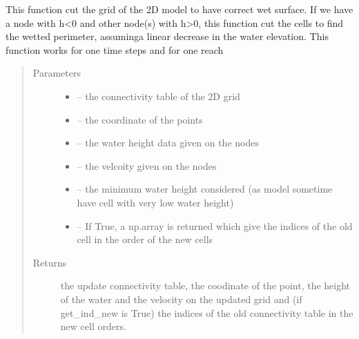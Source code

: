 \documentclass[letterpaper,10pt,english]{sphinxmanual}
\begin{document}
\begin{fulllineitems}
\label{\detokenize{index:src.manage_grid_8.cut_2d_grid}}
This function cut the grid of the 2D model to have correct wet surface. If we have a node with h\textless{}0 and other node(s)
with h\textgreater{}0, this function cut the cells to find the wetted perimeter, assuminga linear decrease in the water elevation.
This function works for one time steps and for one reach
\begin{quote}\begin{description}
\item[{Parameters}] \leavevmode\begin{itemize}
\item {} 
 -- the connectivity table of the 2D grid

\item {} 
 -- the coordinate of the points

\item {} 
 -- the water height data given on the nodes

\item {} 
 -- the velcoity given on the nodes

\item {} 
 -- the minimum water height considered (as model sometime have cell with very low water height)

\item {} 
 -- If True, a np.array is returned which give the indices of the old cell in the order of the new cells

\end{itemize}

\item[{Returns}] \leavevmode
the update connectivity table, the coodinate of the point, the height of the water and the
velocity on the updated grid and (if get\_ind\_new is True) the indices of the old connectivity table in
the new cell orders.

\end{description}\end{quote}

\end{fulllineitems}
\end{document}
